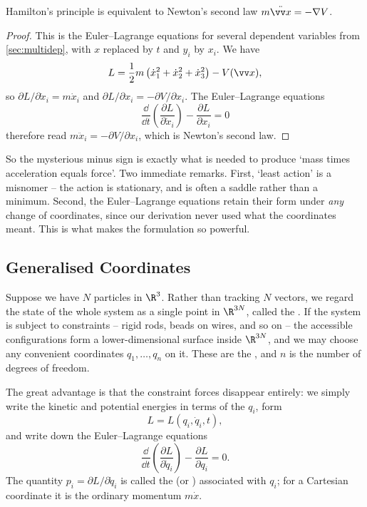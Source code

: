 \documentclass[a4paper]{scrartcl}
\begin{document}
\begin{theorem}
	Hamilton's principle is equivalent to Newton's second law $m\ddot{\vv x} = -\nabla V$.
\end{theorem}
\begin{proof}
	This is the Euler--Lagrange equations for several dependent variables from \autoref{sec:multidep}, with $x$ replaced by $t$ and $y_i$ by $x_i$. We have
	$$
	L = \frac{1}{2}m\left(\dot x_1^2 + \dot x_2^2 + \dot x_3^2\right) - V(\vv x),
	$$
	so $\partial L/\partial \dot x_i = m \dot x_i$ and $\partial L/\partial x_i = -\partial V/\partial x_i$. The Euler--Lagrange equations
	$$
	\frac{\dd}{\dd t}\left(\frac{\partial L}{\partial \dot x_i}\right) - \frac{\partial L}{\partial x_i} = 0
	$$
	therefore read $m\ddot x_i = -\partial V/\partial x_i$, which is Newton's second law.
\end{proof}

So the mysterious minus sign is exactly what is needed to produce `mass times acceleration equals force'. Two immediate remarks. First, `least action' is a misnomer -- the action is stationary, and is often a saddle rather than a minimum. Second, the Euler--Lagrange equations retain their form under \emph{any} change of coordinates, since our derivation never used what the coordinates meant. This is what makes the formulation so powerful.

\subsection{Generalised Coordinates}

Suppose we have $N$ particles in $\R^3$. Rather than tracking $N$ vectors, we regard the state of the whole system as a single point in $\R^{3N}$, called the . If the system is subject to constraints -- rigid rods, beads on wires, and so on -- the accessible configurations form a lower-dimensional surface inside $\R^{3N}$, and we may choose any convenient coordinates $q_1, \dots, q_n$ on it. These are the , and $n$ is the number of degrees of freedom.

The great advantage is that the constraint forces disappear entirely: we simply write the kinetic and potential energies in terms of the $q_i$, form
$$
L = L(q_i, \dot q_i, t),
$$
and write down the Euler--Lagrange equations
$$
\frac{\dd}{\dd t}\left(\frac{\partial L}{\partial \dot q_i}\right) - \frac{\partial L}{\partial q_i} = 0.
$$
The quantity $p_i = \partial L/\partial \dot q_i$ is called the  (or )  associated with $q_i$; for a Cartesian coordinate it is the ordinary momentum $m\dot x$.
\end{document}
